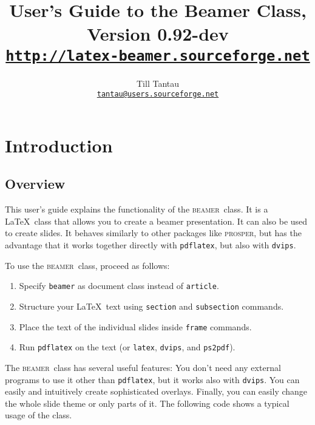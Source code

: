 \documentclass{article}
\def\beamer{\textsc{beamer}}
\begin{document}
\title{User's Guide to the Beamer Class, Version 0.92-dev\\
\Large\href{http://latex-beamer.sourceforge.net}{\texttt{http://latex-beamer.sourceforge.net}}}
\author{Till Tantau\\
  \href{mailto:tantau@users.sourceforge.net}{\texttt{tantau@users.sourceforge.net}}}

\maketitle

\tableofcontents



\section{Introduction}

\subsection{Overview}

This user's guide explains the functionality of the \beamer\ class.
It is a \LaTeX\ class that allows you to create a beamer
presentation. It can also be used to create slides. It behaves
similarly to other packages like \textsc{prosper}, but has the
advantage that it works together directly with \texttt{pdflatex}, but
also with \texttt{dvips}.

To use the \beamer\ class, proceed as follows:
\begin{enumerate}
\item
  Specify \texttt{beamer} as document class instead of
  \texttt{article}.
\item
  Structure your \LaTeX\ text using \texttt{section} and
  \texttt{subsection} commands.
\item
  Place the text of the individual slides inside \texttt{frame}
  commands.
\item
  Run \texttt{pdflatex} on the text (or \texttt{latex},
  \texttt{dvips}, and \texttt{ps2pdf}).
\end{enumerate}

The \beamer\ class has several useful features: You don't need any
external programs to use it other than \texttt{pdflatex}, but it works
also with \texttt{dvips}. You can easily and intuitively create
sophisticated overlays. Finally, you can easily change the whole slide
theme or only parts of it. The following code shows a typical usage of
the class.
\end{document}
